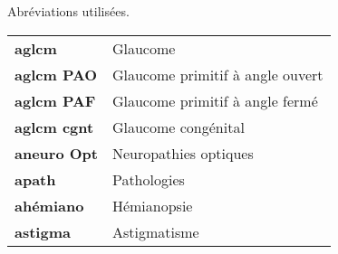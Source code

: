 \documentclass[french,a4paper]{report}
\begin{document}
{\begin{landscape}
\begin{center}
\begin{tabular}{|l|c|c|c|c|c|c|c|c|c|c|}
\end{tabular}
\end{center}
\end{landscape}
\newpage
\small{
Abréviations utilisées.\\
\begin{tabular}{l l}
\textbf{aglcm} & Glaucome\\
\textbf{aglcm PAO} & Glaucome primitif à angle ouvert\\
\textbf{aglcm PAF} & Glaucome primitif à angle fermé\\
\textbf{aglcm cgnt} & Glaucome congénital\\
\textbf{aneuro Opt} & Neuropathies optiques\\
\textbf{apath} & Pathologies\\
\textbf{ahémiano} & Hémianopsie\\
\textbf{astigma} & Astigmatisme
\end{tabular}}
\normalsize
}
\end{document}
